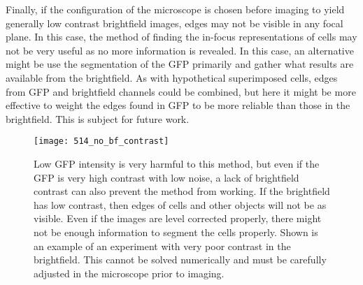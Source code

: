 Finally, if the configuration of the microscope is chosen before imaging to yield generally low contrast brightfield images, edges may not be visible in any focal plane. In this case, the method of finding the in-focus representations of cells may not be very useful as no more information is revealed. In this case, an alternative might be use the segmentation of the GFP primarily and gather what results are available from the brightfield. As with hypothetical superimposed cells, edges from GFP and brightfield channels could be combined, but here it might be more effective to weight the edges found in GFP to be more reliable than those in the brightfield. This is subject for future work.

\begin{figure}[h!]
 \centering
 \texttt{[image: 514\_no\_bf\_contrast]}
 \caption[Lack of brightfield contrast]{
 	Low GFP intensity is very harmful to this method, but even if the GFP is very high contrast with low noise, a lack of brightfield contrast can also prevent the method from working. If the brightfield has low contrast, then edges of cells and other objects will not be as visible. Even if the images are level corrected properly, there might not be enough information to segment the cells properly. Shown is an example of an experiment with very poor contrast in the brightfield. This cannot be solved numerically and must be carefully adjusted in the microscope prior to imaging.
 }
 \label{fig:nobfcontrast}
\end{figure}

